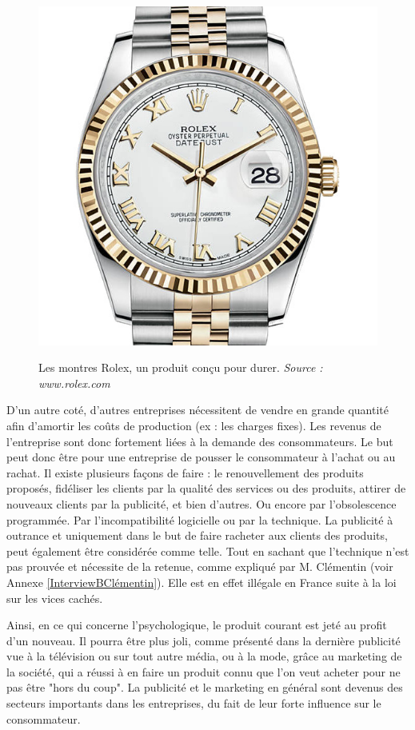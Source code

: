 \begin{figure}
~\includegraphics[scale=0.2]{Rsc/montre_rolex.jpg} 
\caption{Les montres Rolex, un produit conçu pour durer. \textit{Source : www.rolex.com}}
\label{Rolex}
\end{figure} 


\bigbreak
D'un autre coté, d'autres entreprises nécessitent de vendre en grande quantité afin d'amortir les coûts de production (ex : les charges fixes). Les revenus de l'entreprise sont donc fortement liées à la demande des consommateurs. Le but peut donc être pour une entreprise de pousser le consommateur à l'achat ou au rachat. Il existe plusieurs façons de faire :  le renouvellement des produits proposés, fidéliser les clients par la qualité des services ou des produits, attirer de nouveaux clients par la publicité, et bien d'autres. Ou encore par l'obsolescence programmée. Par l'incompatibilité logicielle ou par la technique. La publicité à outrance et uniquement dans le but de faire racheter aux clients des produits, peut également être considérée comme telle. Tout en sachant que l'\op technique n'est pas prouvée et nécessite de la retenue, comme expliqué par M. Clémentin (voir Annexe \ref{InterviewBClémentin}). Elle est en effet illégale en France suite à la loi sur les vices cachés.

Ainsi, en ce qui concerne l'\op psychologique, le produit courant est jeté au profit d'un nouveau. Il pourra être plus joli, comme présenté dans la dernière publicité vue à la télévision ou sur tout autre média, ou à la mode, grâce au marketing de la société, qui a réussi à en faire un produit connu que l'on veut acheter pour ne pas être "hors du coup". La publicité et le marketing en général sont devenus des secteurs importants dans les entreprises, du fait de leur forte influence sur le consommateur.

